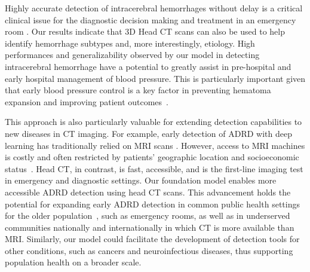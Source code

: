 \documentclass[fleqn,10pt]{wlscirep}
\begin{document}
Highly accurate detection of intracerebral hemorrhages without delay is a critical clinical issue for the diagnostic decision making and treatment in an emergency room \cite{Hemphill2015-yw,Qureshi2009-ve}. Our results indicate that 3D Head CT scans can also be used to help identify hemorrhage subtypes and, more interestingly, etiology. High performances and generalizability observed by our model in detecting intracerebral hemorrhage have a potential to greatly assist in pre-hospital and early hospital management of blood pressure. This is particularly important given that early blood pressure control is a key factor in preventing hematoma expansion and improving patient outcomes~\cite{Macellari2014-zj,Morotti2022-lc}.

This approach is also particularly valuable for extending detection capabilities to new diseases in CT imaging. For example, early detection of ADRD with deep learning has traditionally relied on MRI scans \cite{Li2019-jx, pmlr-v116-liu20a, Xue2024}. However, access to MRI machines is costly and often restricted by patients’ geographic location and socioeconomic status~\cite{https://doi.org/10.1002/neo2.10}. Head CT, in contrast, is fast, accessible, and is the first-line imaging test in emergency and diagnostic settings. Our foundation model enables more accessible ADRD detection using head CT scans. This advancement holds the potential for expanding early ADRD detection in common public health settings for the older population~\cite{lin_dementia_2020, kim2021racial}, such as emergency rooms, as well as in underserved communities nationally and internationally in which CT is more available than MRI. Similarly, our model could facilitate the development of detection tools for other conditions, such as cancers and neuroinfectious diseases, thus supporting population health on a broader scale.
\end{document}
